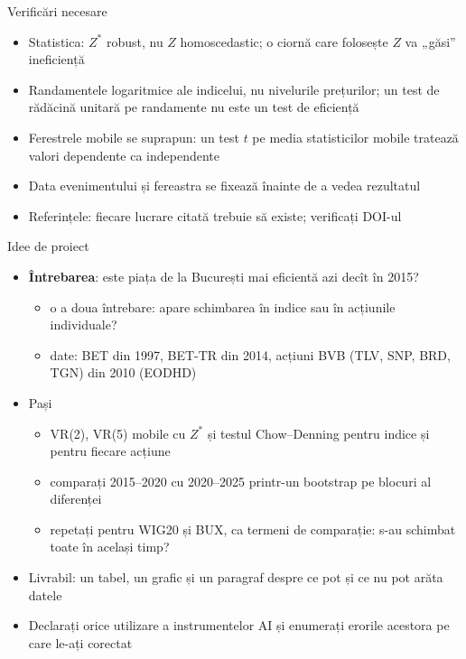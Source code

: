 \begin{frame}{Verificări necesare}
\itemsize{\small}
\begin{itemize}
    \item Statistica: $Z^*$ robust, nu $Z$ homoscedastic; o ciornă care folosește $Z$ va „găsi” ineficiență
    \item Randamentele logaritmice ale indicelui, nu nivelurile prețurilor; un test de rădăcină unitară pe randamente nu este un test de eficiență
    \item Ferestrele mobile se suprapun: un test $t$ pe media statisticilor mobile tratează valori dependente ca independente
    \item Data evenimentului și fereastra se fixează înainte de a vedea rezultatul
    \item Referințele: fiecare lucrare citată trebuie să existe; verificați DOI-ul
\end{itemize}
\end{frame}

\begin{frame}{Idee de proiect}
\itemsize{\small}
\begin{itemize}
    \item \textbf{Întrebarea}: este piața de la București mai eficientă azi decît în 2015?
    \begin{itemize}
        \item o a doua întrebare: apare schimbarea în indice sau în acțiunile individuale?
        \item date: BET din 1997, BET-TR din 2014, acțiuni BVB (TLV, SNP, BRD, TGN) din 2010 (EODHD)
    \end{itemize}
    \item Pași
    \begin{itemize}
        \item VR(2), VR(5) mobile cu $Z^*$ și testul Chow--Denning pentru indice și pentru fiecare acțiune
        \item comparați 2015--2020 cu 2020--2025 printr-un bootstrap pe blocuri al diferenței
        \item repetați pentru WIG20 și BUX, ca termeni de comparație: s-au schimbat toate în același timp?
    \end{itemize}
    \item Livrabil: un tabel, un grafic și un paragraf despre ce pot și ce nu pot arăta datele
    \item Declarați orice utilizare a instrumentelor AI și enumerați erorile acestora pe care le-ați corectat
\end{itemize}
\end{frame}


